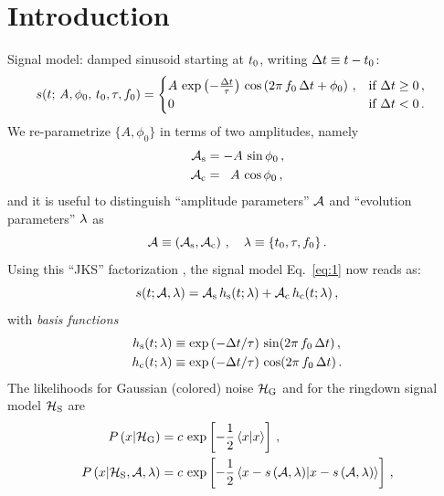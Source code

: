 \documentclass[aps,prd,onecolumn,notitlepage,nofootinbib,superscriptaddress,altaffilletter,floatfix]{revtex4-1}
\begin{document}
\section{Introduction}
\label{Intro}

Signal model: damped sinusoid starting at $t_0$, writing $\Delta t \equiv t - t_0$:
\begin{align}
  \label{eq:1}
  s(t;\, A,\phi_0,\,t_0,\tau,f_0) &=
  \begin{cases}
    A\,\exp\left(-\frac{\Delta t}{\tau}\right)\,\cos\left(2\pi\,f_0\,\Delta t + \phi_0\right)\,, & \text{if } \Delta t \ge 0\,,\\
    0  & \text{if } \Delta t < 0\,.
  \end{cases}
\end{align}
We re-parametrize $\{A,\phi_0\}$ in terms of two amplitudes, namely
\begin{align}
  \label{eq:47}
  {\mathcal A}_{\mathrm{s}} &= -A\,\sin\phi_0\,,\\
  {\mathcal A}_{\mathrm{c}} &= \;\;A\,\cos\phi_0\,,
\end{align}
and it is useful to distinguish ``amplitude parameters'' ${\mathcal A}$ and ``evolution parameters'' $\lambda$ as
\begin{equation}
  \label{eq:11}
  {\mathcal A} \equiv \left({\mathcal A}_{\mathrm{s}},{\mathcal A}_{\mathrm{c}}\right)\,,
  \quad \lambda \equiv \{t_0,\tau, f_0\}\,.
\end{equation}
Using this ``JKS'' factorization \cite{bretthorst1988:_bayesian_spectrum,jks98:_data}, the signal model Eq.~\eqref{eq:1} now reads as:
\begin{equation}
  \label{eq:2}
  s(t; {\mathcal A},\lambda) = {\mathcal A}_{\mathrm{s}} \, h_\mathrm{s}(t;\lambda) + {\mathcal A}_{\mathrm{c}}\,h_\mathrm{c}(t;\lambda)\,,
\end{equation}
with \emph{basis functions}
\begin{align}
  \label{eq:14}
  h_\mathrm{s}(t;\lambda) &\equiv \exp\left(-\Delta t/\tau\right)\,\sin(2\pi \,f_0\,\Delta t)\,,\\
  h_\mathrm{c}(t;\lambda) &\equiv \exp\left(-\Delta t/\tau\right)\,\cos(2\pi \,f_0\,\Delta t)\,.
\end{align}
The likelihoods for Gaussian (colored) noise $\mathcal{H}_{\mathrm{G}}$ and for the ringdown signal model $\mathcal{H}_{\mathrm{S}}$ are
\begin{align}
  P\left(x\middle|\mathcal{H}_{\mathrm{G}}\right) &= c\,\exp\left[-\frac{1}{2}\left\langle x\middle|x\right\rangle\right]\,,   \label{eq:4a}\\
  P\left(x\middle|\mathcal{H}_{\mathrm{S}},{\mathcal A},\lambda\right) &= c\,\exp\left[-\frac{1}{2}\left\langle x-s\left({\mathcal A},\lambda\right)\middle|x-s\left({\mathcal A},\lambda\right)\right\rangle\right]\,,  \label{eq:4b}
\end{align}
\end{document}
